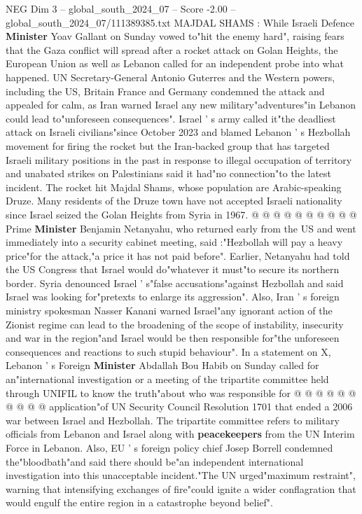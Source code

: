 \begin{textsample}{NEG Dim 3 – global\_south\_2024\_07 – Score -2.00 – global\_south\_2024\_07/111389385.txt}  \label{ex:f3_neg_143}
MAJDAL SHAMS : While Israeli Defence \textbf{Minister} Yoav Gallant on Sunday vowed to"hit the enemy hard", raising fears that the Gaza conflict will spread after a rocket attack on Golan Heights, the European Union as well as Lebanon called for an independent probe into what happened.
UN Secretary-General Antonio Guterres and the Western powers, including the US, Britain France and Germany condemned the attack and appealed for calm, as Iran warned Israel any new military"adventures"in Lebanon could lead to"unforeseen consequences".
Israel ' s army called it"the deadliest attack on Israeli civilians"since October 2023 and blamed Lebanon ' s Hezbollah movement for firing the rocket but the Iran-backed group that has targeted Israeli military positions in the past in response to illegal occupation of territory and unabated strikes on Palestinians said it had"no connection"to the latest incident.
The rocket hit Majdal Shams, whose population are Arabic-speaking Druze.
Many residents of the Druze town have not accepted Israeli nationality since Israel seized the Golan Heights from Syria in 1967. @ @ @ @ @ @ @ @ @ @ Prime \textbf{Minister} Benjamin Netanyahu, who returned early from the US and went immediately into a security cabinet meeting, said :"Hezbollah will pay a heavy price"for the attack,"a price it has not paid before".
Earlier, Netanyahu had told the US Congress that Israel would do"whatever it must"to secure its northern border.
Syria denounced Israel ' s"false accusations"against Hezbollah and said Israel was looking for"pretexts to enlarge its aggression".
Also, Iran ' s foreign ministry spokesman Nasser Kanani warned Israel"any ignorant action of the Zionist regime can lead to the broadening of the scope of instability, insecurity and war in the region"and Israel would be then responsible for"the unforeseen consequences and reactions to such stupid behaviour".
In a statement on X, Lebanon ' s Foreign \textbf{Minister} Abdallah Bou Habib on Sunday called for an"international investigation or a meeting of the tripartite committee held through UNIFIL to know the truth"about who was responsible for @ @ @ @ @ @ @ @ @ @ application"of UN Security Council Resolution 1701 that ended a 2006 war between Israel and Hezbollah.
The tripartite committee refers to military officials from Lebanon and Israel along with \textbf{peacekeepers} from the UN Interim Force in Lebanon.
Also, EU ' s foreign policy chief Josep Borrell condemned the"bloodbath"and said there should be"an independent international investigation into this unacceptable incident."The UN urged"maximum restraint", warning that intensifying exchanges of fire"could ignite a wider conflagration that would engulf the entire region in a catastrophe beyond belief".

\end{textsample}
